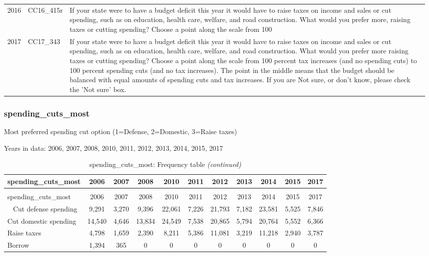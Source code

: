 \documentclass[12pt]{article}
\begin{document}
\begin{longtable}[t]{rl>{\raggedright\arraybackslash}p{10cm}}
2016 & CC16\_415r & If your state were to have a budget deficit this year it would have to raise taxes on income and sales or cut spending, such as on education, health care, welfare, and road construction. What would you prefer more, raising taxes or cutting spending? Choose a point along the scale from 100\\
2017 & CC17\_343 & If your state were to have a budget deficit this year it would have to raise taxes on income and sales or cut spending, such as on education, health care, welfare, and road construction. What would you prefer more raising taxes or cutting spending? Choose a point along the scale from 100 percent tax increases (and no spending cuts) to 100 percent spending cuts (and no tax increases). The point in the middle means that the budget should be balanced with equal amounts of spending cuts and tax increases. If you are Not sure, or don't know, please check the 'Not sure' box.\\*
\end{longtable}

\subsubsection{spending\_cuts\_most}\label{spending_cuts_most}

Most preferred spending cut option (1=Defense, 2=Domestic, 3=Raise
taxes)

Years in data: 2006, 2007, 2008, 2010, 2011, 2012, 2013, 2014, 2015,
2017

\begin{longtable}[t]{lcccccccccc}
\caption{\label{tab:unnamed-chunk-4}spending\_cuts\_most: Frequency table}\\
\toprule
spending\_cuts\_most & 2006 & 2007 & 2008 & 2010 & 2011 & 2012 & 2013 & 2014 & 2015 & 2017\\
\midrule
\endfirsthead
\caption[]{spending\_cuts\_most: Frequency table \textit{(continued)}}\\
\toprule
spending\_cuts\_most & 2006 & 2007 & 2008 & 2010 & 2011 & 2012 & 2013 & 2014 & 2015 & 2017\\
\midrule
\endhead
\
\endfoot
\bottomrule
\endlastfoot
Cut defense spending & 9,291 & 3,270 & 9,396 & 22,061 & 7,226 & 21,793 & 7,182 & 23,581 & 5,525 & 7,846\\
Cut domestic spending & 14,540 & 4,646 & 13,834 & 24,549 & 7,538 & 20,865 & 5,794 & 20,764 & 5,552 & 6,366\\
Raise taxes & 4,798 & 1,659 & 2,390 & 8,211 & 5,386 & 11,081 & 3,219 & 11,218 & 2,940 & 3,787\\
Borrow & 1,394 & 365 & 0 & 0 & 0 & 0 & 0 & 0 & 0 & 0\\*
\end{longtable}
\end{document}
